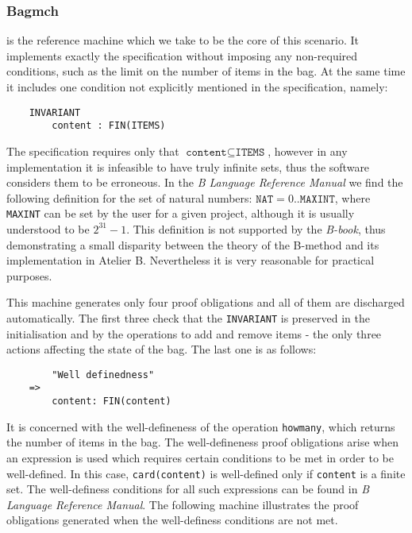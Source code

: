 \documentclass[11pt,journal]{IEEEtran}
\begin{document}
	\subsubsection{Bagmch} is the reference machine which we take to be the core of this scenario. It implements exactly the specification without imposing any non-required conditions, such as the limit on the number of items in the bag. At the same time it includes one condition not explicitly mentioned in the specification, namely:
	\begin{lstlisting}
	INVARIANT
		content : FIN(ITEMS)
	\end{lstlisting}

	The specification requires only that $\texttt{content} \subseteq \texttt{ITEMS}$, however in any implementation it is infeasible to have truly infinite sets, thus the software considers them to be erroneous. In the \emph{B Language Reference Manual}\cite{b reference} we find the following definition for the set of natural numbers: ${\texttt{NAT}  = 0 .. \texttt{MAXINT}}$, where \texttt{MAXINT} can be set by the user for a given project, although it is usually understood to be $2^{31}-1$. This definition is not supported by the \emph{B-book}, thus demonstrating a small disparity between the theory of the B-method and its implementation in Atelier B. Nevertheless it is very reasonable for practical purposes.
	
	This machine generates only four proof obligations and all of them are discharged automatically. The first three check that the \texttt{INVARIANT} is preserved in the initialisation and by the operations to add and remove items - the only three actions affecting the state of the bag. The last one is as follows:
	
	\begin{lstlisting}
		"Well definedness" 
	=> 
		content: FIN(content)
	\end{lstlisting}
	
	It is concerned with the well-defineness of the operation \texttt{howmany}, which returns the number of items in the bag. The well-defineness proof obligations arise when an expression is used which requires certain conditions to be met in order to be well-defined. In this case, \texttt{card(content)} is well-defined only if \texttt{content} is a finite set. The well-definess conditions for all such expressions can be found in \emph{B Language Reference Manual}\cite{b reference}. The following machine illustrates the proof obligations generated when the well-definess conditions are not met.
	
\end{document}
